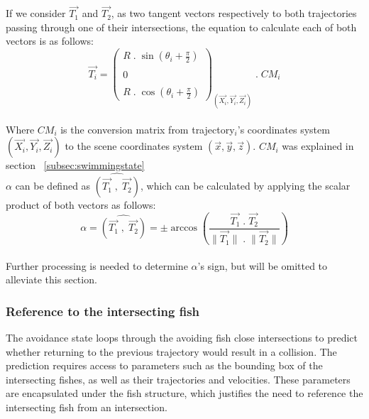 If we consider $\overrightarrow{T_1}$ and $\overrightarrow{T_2}$, as two tangent vectors respectively to both trajectories passing through one of their intersections, the equation to calculate each of both vectors is as follows:\\

\[
\overrightarrow{T_i} = \left(
\begin{array}{ccc}
R \; . \; \sin \left( \theta_i + \frac{\displaystyle \pi}{2} \right) \\ \\
0 \\ \\
R \; . \; \cos \left( \theta_i + \frac{\displaystyle \pi}{2} \right)
\end{array}
\right)_{(\overrightarrow{X_i}, \overrightarrow{Y_i}, \overrightarrow{Z_i})} \; . \; CM_i
\] \\
Where $CM_i$ is the conversion matrix from trajectory$_i$'s coordinates system $(\overrightarrow{X_i}, \overrightarrow{Y_i}, \overrightarrow{Z_i})$ to the scene coordinates system $(\overrightarrow{x}, \overrightarrow{y}, \overrightarrow{z})$. $CM_i$ was explained in section ~\ref{subsec:swimmingstate}\\

$\alpha$ can be defined as  $\widehat{(\overrightarrow{T_1} \; , \; \overrightarrow{T_2})}$, which can be calculated by applying the scalar product of both vectors as follows:\\

\[
\alpha = \widehat{(\overrightarrow{T_1} \; , \; \overrightarrow{T_2})} = 
\pm \arccos \left(
\frac{\displaystyle \overrightarrow{T_1} \; . \; \overrightarrow{T_2}} {\displaystyle \| \overrightarrow{T_1} \| \; . \; \| \overrightarrow{T_2} \|} 
\right)
\] \\
Further processing is needed to determine $\alpha$'s sign, but will be omitted to alleviate this section.

\subsubsection{Reference to the intersecting fish}

The avoidance state loops through the avoiding fish close intersections to predict whether returning to the previous trajectory would result in a collision. The prediction requires access to parameters such as the bounding box of the intersecting fishes, as well as their trajectories and velocities. These parameters are encapsulated under the fish structure, which justifies the need to reference the intersecting fish from an intersection.



